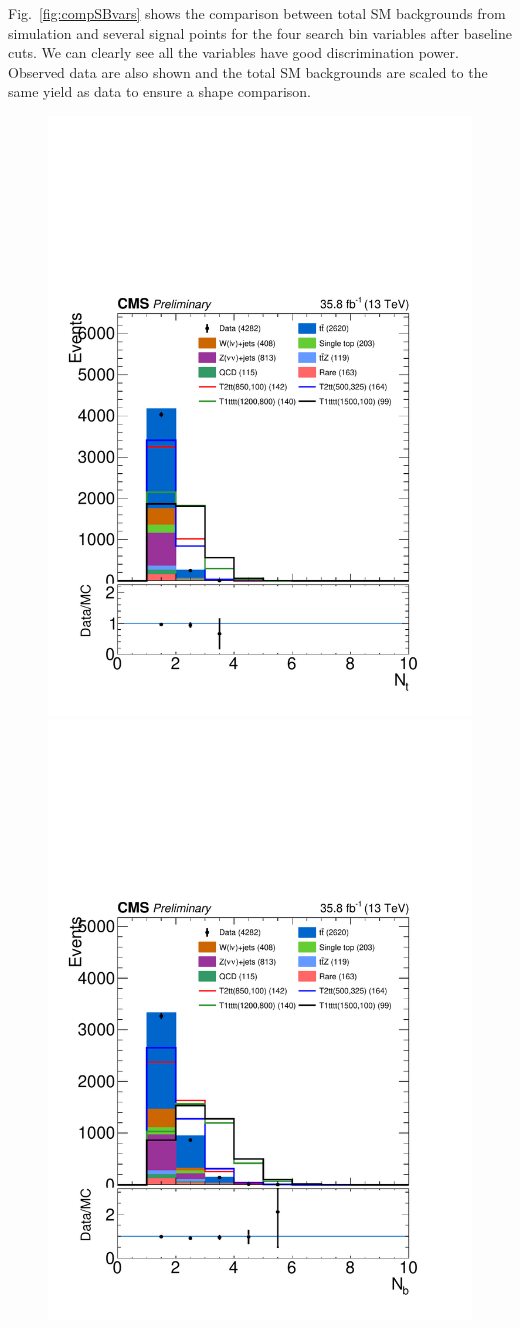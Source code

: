 Fig.~\ref{fig:compSBvars} 
shows the comparison between total SM backgrounds from simulation and several signal points for the four search bin variables after baseline cuts. We can clearly see all the variables have good discrimination power. Observed data are also shown and the total SM backgrounds are scaled to the same yield as data to ensure a shape comparison. %

\begin{figure}[h]
  \begin{center}
    \includegraphics[width=0.45\linewidth]{sections/mc4/EvtSelSBOpt/figures/DataMC_MET_model_NTops_baseline.pdf}
    \includegraphics[width=0.45\linewidth]{sections/mc4/EvtSelSBOpt/figures/DataMC_MET_model_NBJEts_baseline.pdf}\\

\end{center}
\end{figure}
